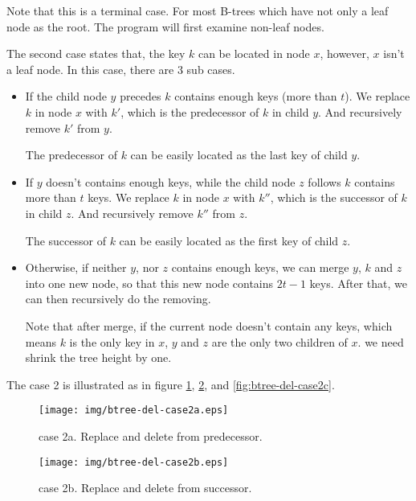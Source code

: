 \documentclass{article}
\begin{document}
Note that this is a terminal case. For most B-trees which have
not only a leaf node as the root. The program will first examine
non-leaf nodes. 

The second case states that, the key $k$ can be located in node $x$,
however, $x$ isn't a leaf node. In this case, there are 3 sub cases.

\begin{itemize}
\item If the child node $y$ precedes $k$ contains enough keys (more than $t$). 
We replace $k$ in node $x$ with $k'$, which is 
the predecessor of $k$ in child $y$. And recursively remove $k'$
from $y$.

The predecessor of $k$ can be easily located as the last key of child
$y$.

\item If $y$ doesn't contains enough keys, while the child node $z$
follows $k$ contains more than $t$ keys. We replace $k$ in node $x$
with $k''$, which is the successor of $k$ in child $z$. And recursively 
remove $k''$ from $z$.

The successor of $k$ can be easily located as the first key of child $z$.

\item Otherwise, if neither $y$, nor $z$ contains enough keys, we 
can merge $y$, $k$ and $z$ into one new node, so that this new node
contains $2t-1$ keys. After that, we can then recursively do the removing.

Note that after merge, if the current node doesn't contain any keys,
which means $k$ is the only key in $x$, $y$ and $z$ are the only two
children of $x$. we need shrink the tree height by one.
\end{itemize} 

The case 2 is illustrated as in figure \ref{fig:btree-del-case2a}, 
\ref{fig:btree-del-case2b}, and \ref{fig:btree-del-case2c}.

\begin{figure}[htbp]
  \begin{center}
    \texttt{[image: img/btree-del-case2a.eps]}
    \caption{case 2a. Replace and delete from predecessor.} \label{fig:btree-del-case2a}
  \end{center}
\end{figure}

\begin{figure}[htbp]
  \begin{center}
    \texttt{[image: img/btree-del-case2b.eps]}
    \caption{case 2b. Replace and delete from successor.} \label{fig:btree-del-case2b}
  \end{center}
\end{figure}
\end{document}
